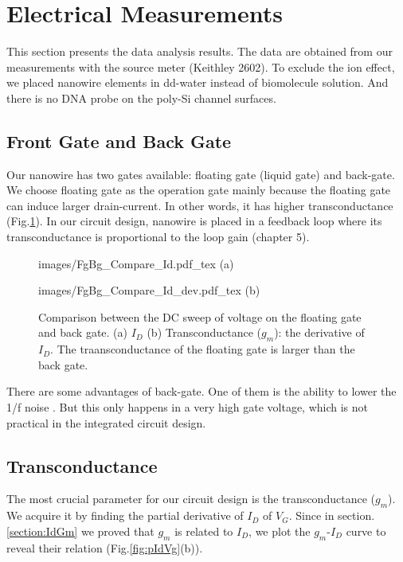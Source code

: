 \section{Electrical Measurements}
This section presents the data analysis results.
The data are obtained from our measurements with the source meter (Keithley 2602).
To exclude the ion effect, we placed nanowire elements in dd-water instead of biomolecule solution.
And there is no DNA probe on the poly-Si channel surfaces.

\subsection{Front Gate and Back Gate}
Our nanowire has two gates available: floating gate (liquid gate) and back-gate.
We choose floating gate as the operation gate mainly because the floating gate can induce larger drain-current.
In other words, it has higher transconductance (Fig.\ref{fig:IdVgandgbsId}).
In our circuit design, nanowire is placed in a feedback loop where its transconductance is proportional to the loop gain (chapter 5).

\begin{figure}[!htbp]
    \centering
    \begin{minipage}[t][0.1\textheight]{0.4\textheight}
        \centering
        \def\svgwidth{12cm}
        \fontsize{6}{15}\selectfont
         {images/FgBg_Compare_Id.pdf_tex}
        (a)
    \end{minipage}
    \vfill
    \begin{minipage}[t][0.1\textheight]{0.4\textheight}
        \centering
        \def\svgwidth{12cm}
        \fontsize{6}{15}\selectfont
         {images/FgBg_Compare_Id_dev.pdf_tex}
        (b)
    \end{minipage}
    \caption{Comparison between the DC sweep of voltage on the floating gate and back gate. (a) $I_D$ (b) Transconductance ($g_m$): the derivative of $I_D$. The traansconductance of the floating gate is larger than the back gate.}
    \label{fig:IdVgandgbsId}
\end{figure}


There are some advantages of back-gate.
One of them is the ability to lower the 1/f noise \cite{C7, C8}.
But this only happens in a very high gate voltage, which is not practical in the integrated circuit design.

\subsection{Transconductance}
The most crucial parameter for our circuit design is the transconductance ($g_m$).
We acquire it by finding the partial derivative of $I_D$ of $V_{G}$.
Since in section.\ref{section:IdGm} we proved that $g_m$ is related to $I_D$, we plot the $g_m$-$I_D$ curve to reveal their relation (Fig.\ref{fig:pIdVg}(b)).

